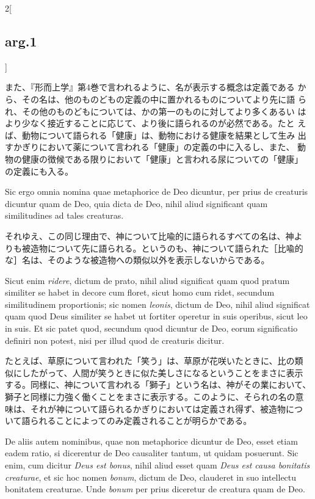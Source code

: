 \documentclass[paper=a4paper,fontsize=10pt,jafontsize=9pt,titlepage]{jlreq}
\begin{document}
\begin{paracol}{2}[\subsection{arg.1}]
\switchcolumn

また、『形而上学』第4巻で言われるように、名が表示する概念は定義である
から、その名は、他のものどもの定義の中に置かれるものについてより先に語
られ、その他のものどもについては、かの第一のものに対してより多くあるい
はより少なく接近することに応じて、より後に語られるのが必然である。たと
えば、動物について語られる「健康」は、動物における健康を結果として生み
出すかぎりにおいて薬について言われる「健康」の定義の中に入るし、また、
動物の健康の徴候である限りにおいて「健康」と言われる尿についての「健康」
の定義にも入る。

\switchcolumn*

Sic ergo omnia nomina quae metaphorice de Deo dicuntur, per prius de
creaturis dicuntur quam de Deo, quia dicta de Deo, nihil aliud
significant quam similitudines ad tales creaturas.

\switchcolumn

それゆえ、この同じ理由で、神について比喩的に語られるすべての名は、神よ
りも被造物について先に語られる。というのも、神について語られた［比喩的
な］名は、そのような被造物への類似以外を表示しないからである。

\switchcolumn*

Sicut enim {\itshape ridere}, dictum de prato, nihil aliud significat
quam quod pratum similiter se habet in decore cum floret, sicut homo
cum ridet, secundum similitudinem proportionis; sic nomen {\itshape
leonis}, dictum de Deo, nihil aliud significat quam quod Deus
similiter se habet ut fortiter operetur in suis operibus, sicut leo in
suis. Et sic patet quod, secundum quod dicuntur de Deo, eorum
significatio definiri non potest, nisi per illud quod de creaturis
dicitur.

\switchcolumn

たとえば、草原について言われた「笑う」は、草原が花咲いたときに、比の類
似にしたがって、人間が笑うときに似た美しさになるということをまさに表示
する。同様に、神について言われる「獅子」という名は、神がその業において、
獅子と同様に力強く働くことをまさに表示する。このように、そられの名の意
味は、それが神について語られるかぎりにおいては定義され得ず、被造物につ
いて語られることによってのみ定義されることが明らかである。

\switchcolumn*

De aliis autem nominibus, quae non metaphorice dicuntur de Deo, esset
etiam eadem ratio, si dicerentur de Deo causaliter tantum, ut quidam
posuerunt. Sic enim, cum dicitur {\itshape Deus est bonus}, nihil
aliud esset quam {\itshape Deus est causa bonitatis creaturae}, et sic
hoc nomen {\itshape bonum}, dictum de Deo, clauderet in suo intellectu
bonitatem creaturae. Unde {\itshape bonum} per prius diceretur de
creatura quam de Deo.


\end{paracol}
\end{document}
